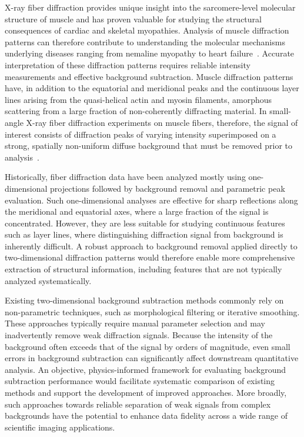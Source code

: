 \documentclass[iucr]{iucrjournals}
\begin{document}
X-ray fiber diffraction provides unique insight into the sarcomere-level molecular structure of muscle and has proven valuable for studying the structural consequences of cardiac and skeletal myopathies. Analysis of muscle diffraction patterns can therefore contribute to understanding the molecular mechanisms underlying diseases ranging from nemaline myopathy to heart failure~\cite{MaIrving2022}. Accurate interpretation of these diffraction patterns requires reliable intensity measurements and effective background subtraction. Muscle diffraction patterns have, in addition to the equatorial and meridional peaks and the continuous layer lines arising from the quasi-helical actin and myosin filaments, amorphous scattering from a large fraction of non-coherently diffracting material. In small-angle X-ray fiber diffraction experiments on muscle fibers, therefore, the signal of interest consists of diffraction peaks of varying intensity superimposed on a strong, spatially non-uniform diffuse background that must be removed prior to analysis~\cite{squire2003ccp13_software}.

Historically, fiber diffraction data have been analyzed mostly using one-dimensional projections followed by background removal and parametric peak evaluation. Such one-dimensional analyses are effective for sharp reflections along the meridional and equatorial axes, where a large fraction of the signal is concentrated. However, they are less suitable for studying continuous features such as layer lines, where distinguishing diffraction signal from background is inherently difficult. A robust approach to background removal applied directly to two-dimensional diffraction patterns would therefore enable more comprehensive extraction of structural information, including features that are not typically analyzed systematically.

Existing two-dimensional background subtraction methods commonly rely on non-parametric techniques, such as morphological filtering or iterative smoothing. These approaches typically require manual parameter selection and may inadvertently remove weak diffraction signals. Because the intensity of the background often exceeds that of the signal by orders of magnitude, even small errors in background subtraction can significantly affect downstream quantitative analysis. An objective, physics-informed framework for evaluating background subtraction performance would facilitate systematic comparison of existing methods and support the development of improved approaches. More broadly, such approaches towards reliable separation of weak signals from complex backgrounds have the potential to enhance data fidelity across a wide range of scientific imaging applications.
\end{document}
